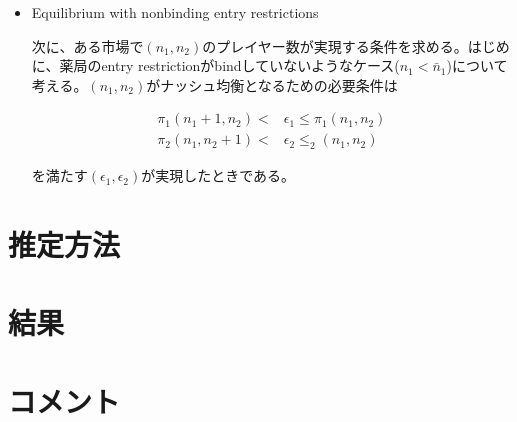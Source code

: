 \documentclass[11pt]{jsarticle}
\begin{document}
\begin{itemize}
  \item Equilibrium with nonbinding entry restrictions

  次に、ある市場で$(n_1, n_2)$のプレイヤー数が実現する条件を求める。はじめに、薬局のentry restrictionがbindしていないようなケース($n_1 < \bar{n}_1$)について考える。$(n_1, n_2)$がナッシュ均衡となるための必要条件は

  \begin{align*}
    \pi_1(n_1 + 1, n_2)<&\epsilon_1 \leq \pi_1(n_1, n_2) \\
    \pi_2(n_1, n_2 + 1) < & \epsilon_2 \leq_2 (n_1, n_2)
  \end{align*}

  を満たす$(\epsilon_1, \epsilon_2)$が実現したときである。

\end{itemize}

\section{推定方法}

\section{結果}

\section{コメント}
\end{document}
